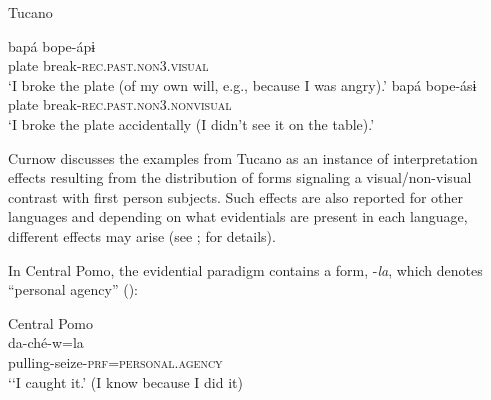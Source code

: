 \documentclass[output=paper]{langsci/langscibook}
\begin{document}
\begin{exe}
\ex Tucano\label{ex:hb2}
	\begin{xlist}
	\ex \label{ex:hb2a}
	\gll bapá bope-ápɨ\\
	plate break-\textsc{rec}.\textsc{past}.\textsc{non}3.\textsc{visual}\\
	\trans ‘I broke the plate (of my own will, e.g., because I was angry).’ 
	\ex \label{ex:hb2b}
	\gll bapá bope-ásɨ \\
	plate break-\textsc{rec}.\textsc{past}.\textsc{non}3.\textsc{nonvisual}\\
	\trans ‘I broke the plate accidentally (I didn't see it on the table).’ 	
	\end{xlist}
\end{exe}

Curnow discusses the examples from Tucano as an instance of interpretation effects resulting from the distribution of forms signaling a visual/non-visual contrast with first person subjects. Such effects are also reported for other languages and depending on what evidentials are present in each language, different effects may arise (see \citealt{Curnow2002}; \citealt{Curnow2003} for details).

In Central Pomo, the evidential paradigm contains a form, -\textit{la}, which denotes “personal agency” (\citealt[181]{Mithun1999}):

\begin{exe}
\ex Central Pomo\label{ex:hb3}\\
	\gll da-ché-w=la\\
	pulling-seize-\textsc{prf}=\textsc{personal}.\textsc{agency}\\
	\trans ‘‘I caught it.’ (I know because I did it) 
\end{exe}
\end{document}
